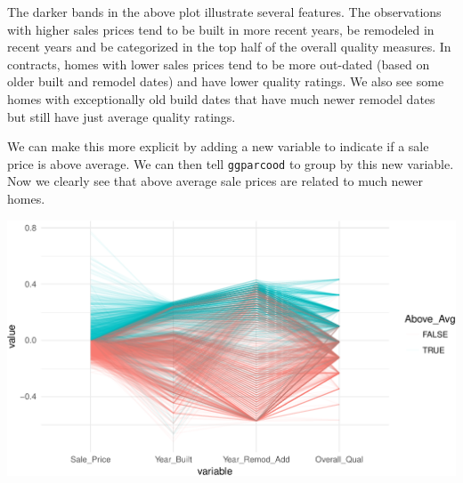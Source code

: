 \documentclass[]{article}
\newenvironment{Shaded}{\begin{snugshade}}{\end{snugshade}}
\newcommand{\KeywordTok}[1]{\textcolor[rgb]{0.13,0.29,0.53}{\textbf{#1}}}
\newcommand{\DataTypeTok}[1]{\textcolor[rgb]{0.13,0.29,0.53}{#1}}
\newcommand{\DecValTok}[1]{\textcolor[rgb]{0.00,0.00,0.81}{#1}}
\newcommand{\StringTok}[1]{\textcolor[rgb]{0.31,0.60,0.02}{#1}}
\newcommand{\OperatorTok}[1]{\textcolor[rgb]{0.81,0.36,0.00}{\textbf{#1}}}
\newcommand{\NormalTok}[1]{#1}
\begin{document}
The darker bands in the above plot illustrate several features. The
observations with higher sales prices tend to be built in more recent
years, be remodeled in recent years and be categorized in the top half
of the overall quality measures. In contracts, homes with lower sales
prices tend to be more out-dated (based on older built and remodel
dates) and have lower quality ratings. We also see some homes with
exceptionally old build dates that have much newer remodel dates but
still have just average quality ratings.

We can make this more explicit by adding a new variable to indicate if a
sale price is above average. We can then tell \texttt{ggparcood} to
group by this new variable. Now we clearly see that above average sale
prices are related to much newer homes.

\begin{Shaded}
\end{Shaded}

\begin{center}\includegraphics{Chapter_3_-_Visualization_files/figure-latex/parallel2-1} \end{center}
\end{document}
